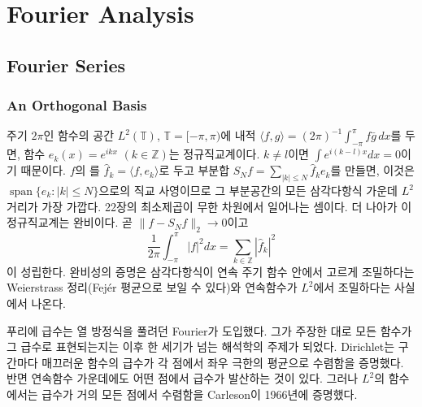 \chapter{Fourier Analysis}
\label{ch:fourier}


\section{Fourier Series}
\label{sec:fourier-series}

\subsection{An Orthogonal Basis}

주기 $2\pi$인 함수의 공간 $L^2(\mathbb T)$, $\mathbb T=[-\pi,\pi)$에 내적 $\langle f,g\rangle=(2\pi)^{-1}\int_{-\pi}^{\pi}f\bar g\,dx$를 두면, 함수 $e_k(x)=e^{ikx}$ $(k\in\mathbb Z)$는 정규직교계이다. $k\ne l$이면 $\int e^{i(k-l)x}dx=0$이기 때문이다. $f$의 를 $\hat f_k=\langle f,e_k\rangle$로 두고 부분합 $S_Nf=\sum_{|k|\le N}\hat f_ke_k$를 만들면, 이것은 $\operatorname{span}\{e_k:|k|\le N\}$으로의 직교 사영이므로 그 부분공간의 모든 삼각다항식 가운데 $L^2$ 거리가 가장 가깝다. 22장의 최소제곱이 무한 차원에서 일어나는 셈이다. 더 나아가 이 정규직교계는 완비이다. 곧 $\|f-S_Nf\|_2\to0$이고 
\[
\frac1{2\pi}\int_{-\pi}^{\pi}|f|^2dx=\sum_{k\in\mathbb Z}|\hat f_k|^2
\]
이 성립한다\cite{katznelson2004}. 완비성의 증명은 삼각다항식이 연속 주기 함수 안에서 고르게 조밀하다는 Weierstrass 정리(Fejér 평균으로 보일 수 있다)와 연속함수가 $L^2$에서 조밀하다는 사실에서 나온다.

푸리에 급수는 열 방정식을 풀려던 Fourier가 도입했다\cite{fourier1822}. 그가 주장한 대로 모든 함수가 그 급수로 표현되는지는 이후 한 세기가 넘는 해석학의 주제가 되었다. Dirichlet는 구간마다 매끄러운 함수의 급수가 각 점에서 좌우 극한의 평균으로 수렴함을 증명했다\cite{dirichlet1829}. 반면 연속함수 가운데에도 어떤 점에서 급수가 발산하는 것이 있다. 그러나 $L^2$의 함수에서는 급수가 거의 모든 점에서 수렴함을 Carleson이 1966년에 증명했다\cite{carleson1966}.

